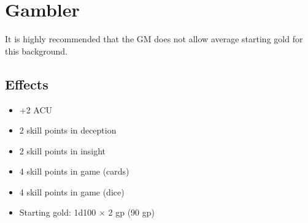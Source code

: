 \section{Gambler}\label{background:gambler}
It is highly recommended that the GM does not allow average starting gold for
this background.

\subsection*{Effects}
\begin{itemize}
    \item +2 ACU
    \item 2 skill points in deception
    \item 2 skill points in insight
    \item 4 skill points in game (cards)
    \item 4 skill points in game (dice)
    \item Starting gold: 1d100 $\times$ 2 gp (90 gp)
\end{itemize}
